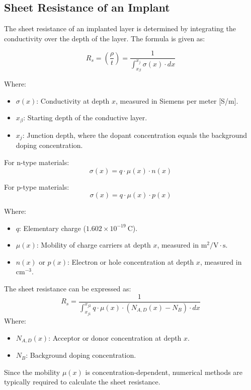 \documentclass{report}
\begin{document}
\subsection{Sheet Resistance of an Implant}
The sheet resistance of an implanted layer is determined by integrating the conductivity over the depth of the layer. The formula is given as:

$$R_{s}=(\frac{\rho}{t})=\frac{1}{\int_{x_{\beta}}^{x_{j}}\sigma(x)\cdot dx}$$

Where:
\begin{itemize}
    \item $\sigma(x)$: Conductivity at depth $x$, measured in Siemens per meter [S/m].
    \item $x_{\beta}$: Starting depth of the conductive layer.
    \item $x_{j}$: Junction depth, where the dopant concentration equals the background doping concentration.
\end{itemize}

For n-type materials:
$$\sigma(x)=q\cdot\mu(x)\cdot n(x)$$

For p-type materials:
$$\sigma(x)=q\cdot\mu(x)\cdot p(x)$$

Where:
\begin{itemize}
    \item $q$: Elementary charge ($1.602 \times 10^{-19}~\text{C}$).
    \item $\mu(x)$: Mobility of charge carriers at depth $x$, measured in $\text{m}^2/\text{V}\cdot\text{s}$.
    \item $n(x)$ or $p(x)$: Electron or hole concentration at depth $x$, measured in $\text{cm}^{-3}$.
\end{itemize}

The sheet resistance can be expressed as:
$$R_{s}=\frac{1}{\int_{x_{j1}}^{x_{j2}}q\cdot\mu(x)\cdot(N_{A,D}(x)-N_{B})\cdot dx}$$
Where:
\begin{itemize}
    \item $N_{A,D}(x)$: Acceptor or donor concentration at depth $x$.
    \item $N_{B}$: Background doping concentration.
\end{itemize}
Since the mobility $\mu(x)$ is concentration-dependent, numerical methods are typically required to calculate the sheet resistance.
\end{document}
